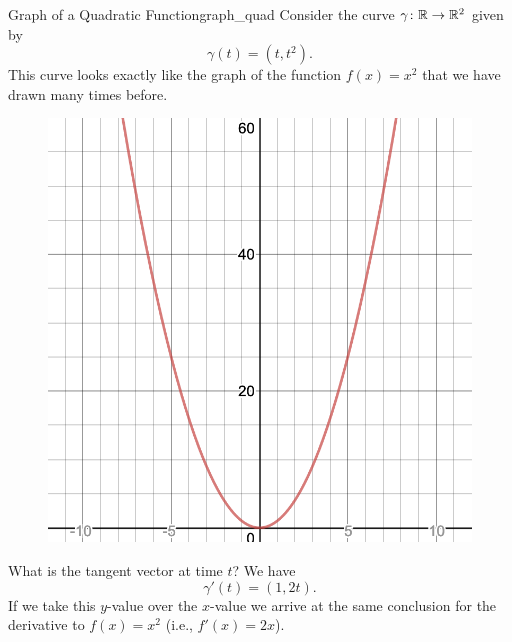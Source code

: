         \begin{ex}{Graph of a Quadratic Function}{graph_quad}
        Consider the curve $\gamma\colon \mathbb{R} \to \mathbb{R}^2$ given by
        \[
        \gamma(t)=(t,t^2).
        \]
        This curve looks exactly like the graph of the function $f(x)=x^2$ that we have drawn many times before. 
        \begin{figure}[H]
            \centering
            \includegraphics[width=.4\textwidth]{Figures_Part_6/quadratic_curve.png}
        \end{figure}
        
        What is the tangent vector at time $t$? We have
        \[
        \gamma'(t)=(1,2t).
        \]
        If we take this $y$-value over the $x$-value we arrive at the same conclusion for the derivative to $f(x)=x^2$ (i.e., $f'(x)=2x$).
        \end{ex}
        
